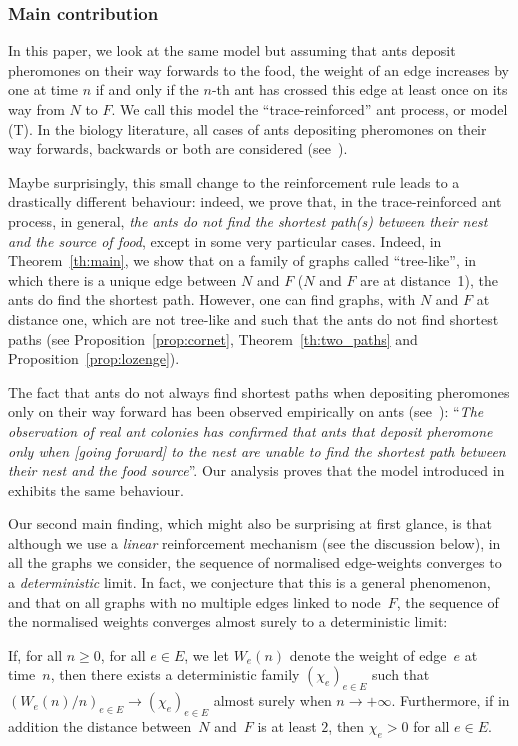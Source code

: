 \subsubsection*{Main contribution} In this paper, we look at the same model
but assuming that ants deposit pheromones on their way forwards to the food,
\ie the weight of an edge increases by one at time $n$ if and only
if the $n$-th ant has crossed this edge at least once on its way from $N$ to $F$.
We call this model the ``trace-reinforced'' ant process, or model (T).
In the biology literature, all cases of ants depositing pheromones on their way forward{s},
backwards or both are considered (see~\cite[Ch.\,1]{book_ant}).

Maybe surprisingly, this small change to the reinforcement rule leads to a drastically different behaviour:
indeed, we prove that, in the trace-reinforced ant process, in general,
\emph{the ants do not find the shortest path(s) between their nest and the source of food},
except in some very particular cases. Indeed,
in Theorem~\ref{th:main}, we show that on a family of graphs called ``tree-like'', in which there is a unique edge between $N$ and $F$ ($N$ and $F$ are at distance~1), the ants do find the shortest path. However, {one can find graphs, with $N$ and $F$ at distance one, which are not tree-like and such that the ants do not find shortest paths} (see Proposition~\ref{prop:cornet}, Theorem~\ref{th:two_paths} and Proposition~\ref{prop:lozenge}).

The fact that ants do not always find shortest paths when depositing pheromones only on their way
forward has been observed empirically on ants (see~\cite[\S 1.1.2]{book_ant}):
``\emph{The observation of real ant colonies has confirmed that ants that deposit pheromone only
when [going forward] to the nest are unable to find the shortest path between their nest and
the food source}''.
Our analysis proves that the model introduced in~\cite{KMS} exhibits the same behaviour.\enlargethispage{.5\baselineskip}%

Our second main finding, which might also be surprising at first glance, is that although we use a \emph{linear} reinforcement mechanism (see the discussion below), in all the graphs we consider, the sequence of normalised edge-weights converges to a \emph{deterministic} limit.
In fact, we conjecture that this is a general phenomenon, and that on all graphs with no multiple edges linked to node~$F$, the sequence of the normalised weights converges almost surely to a deterministic limit:
\begin{conjecture}\label{conj}
If, for all $n\geq 0$, for all $e\in E$, we let $W_e(n)$ denote the weight of edge~$e$ at time~$n$,
then there exists a deterministic family $(\chi_e)_{e\in E}$
such that $(W_e(n)/n)_{e\in E}\to (\chi_e)_{e\in E}$ almost surely when $n\to+\infty$.
Furthermore, if in addition the distance between~$N$ and~$F$ is at least $2$, then $\chi_e>0$ for all $e\in E$.
\end{conjecture}


